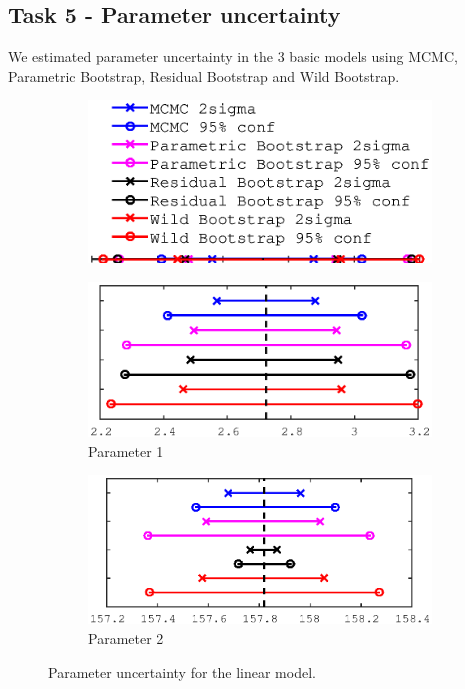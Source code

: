 \documentclass[11pt,a4paper,oneside]{report}
\begin{document}
\subsection*{Task 5 - Parameter uncertainty}

We estimated parameter uncertainty in the 3 basic models using MCMC, Parametric Bootstrap, Residual Bootstrap and Wild Bootstrap. 

\begin{figure}
   \centering
    \begin{subfigure}[b]{0.4\textwidth}
    \includegraphics[width=\textwidth, trim=0 15 0 0,clip=true]{figures/task5/uncert_legend.eps}
  \end{subfigure}%

  \begin{subfigure}[b]{0.5\textwidth}
    \includegraphics[width=\textwidth, trim=0 0 0 0,clip=true]{figures/task5/uncert_model1_param1.eps}
    \caption{Parameter 1}
  \end{subfigure}%
  \begin{subfigure}[b]{0.5\textwidth}
    \includegraphics[width=\textwidth, trim=0 0 0 0,clip=true]{figures/task5/uncert_model1_param2.eps}
    \caption{Parameter 2}
  \end{subfigure}%
  
  \caption{Parameter uncertainty for the linear model.}
  \label{fig:c5uncertM1}
  
\end{figure}
\end{document}
